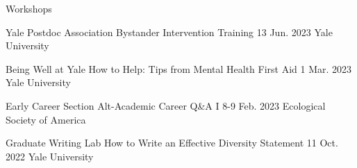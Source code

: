 Workshops

\begin{cventries}

  \cventry
    {Yale Postdoc Association} %
    {Bystander Intervention Training} %
    {13 Jun. 2023} %
    {Yale University} %
    {
    }

  \cventry
    {Being Well at Yale} %
    {How to Help: Tips from Mental Health First Aid} %
    {1 Mar. 2023} %
    {Yale University} %
    {
    }

  \cventry
    {Early Career Section} %
    {Alt-Academic Career Q\&A I} %
    {8-9 Feb. 2023} %
    {Ecological Society of America} %
    {
    }    

  \cventry
    {Graduate Writing Lab} %
    {How to Write an Effective Diversity Statement} %
    {11 Oct. 2022} %
    {Yale University} %
    {
    }


\end{cventries}
